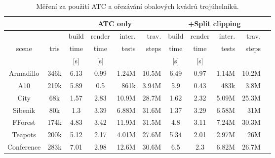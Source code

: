 \documentclass[report,11pt]{elsarticle}
\begin{document}
\begin{table}[t]\footnotesize
\begin{center}
\begin{tabular}{| c |  c || c | c | r | r || c | c | r | r | r}
\hline
\multicolumn{2}{|c||}{} & \multicolumn{4}{|c||}{ATC only} &  \multicolumn{4}{|c|}{+Split clipping}  \\
\hline
          &         &  build       & render  & inter. &   trav.   & build     & render  & inter. &   trav.   \\
scene & tris & time & time    &  tests   & steps  &  time & time    &  tests   & steps \\
          &           &    [s]   &  [s]  &      &      &  [s]    & [s]  &  & \\
\hline
\hline
Armadillo & 346k & 6.13 & 0.99   &  	1.24M		& 10.5M & 6.49	&0.97	 & 1.14M & 10.2M 	\\ \hline
A10 & 219k  & 5.89 & 0.5  &   		861k		& 3.94M & 5.9	&0.43  & 483k & 3.8M	\\ \hline
City & 68k  &  1.57 & 2.83  & 		10.9M		& 28.7M & 1.62	&2.32	 & 5.09M	& 25.3M \\ \hline
Sibenik & 80k &  1.3 & 3.39  &		 6.88M	& 31.6M & 1.37	&3.29	 & 6.58M & 31M	\\ \hline
FForest & 174k & 4.83 & 3.42  & 		 11.9M	& 31.5M & 4.8	&3.11	 & 7.24M & 30.3M	\\ \hline
Teapots & 200k & 5.12 &  2.17  & 	 4.01M	& 27.6M & 5.34	&2.01	& 2.97M & 26M	\\ \hline
Conference & 283k & 7.01 &  2.98  & 	 12.6M	& 30.6M & 6.5	&2.3	& 6.82M & 26.7M	\\ \hline

\end{tabular}
\end{center}
\vspace*{0mm}
\caption{{\label{tab:tab2}}Měření za použití ATC a ořezávání obalových kvádrů trojúhelníků.}
\vspace*{0mm}
\label{shadowtable}
\end{table}
\end{document}
